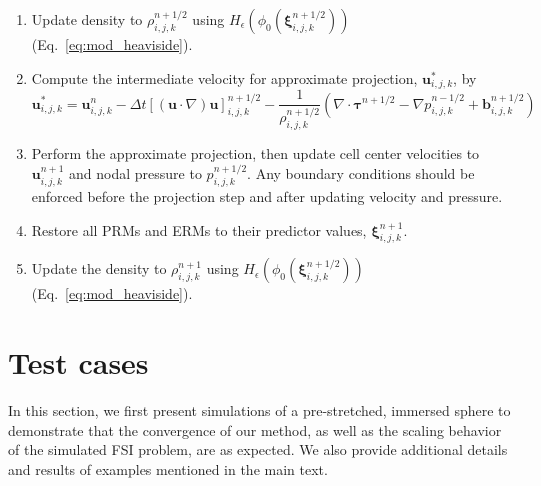 \documentclass[times, 10pt]{article}
\renewcommand{\vec}[1]{\mathbf{#1}}
\newcommand{\vu}{\vec{u}}
\newcommand{\vxi}{\boldsymbol\xi}
\newcommand{\vtau}{\boldsymbol\tau}
\begin{document}
\begin{enumerate}
	\item Update density to $\rho_{i,j,k}^{n+1/2}$ using $H_\epsilon(\phi_0(  \vxi_{i,j,k}^{n+1/2} ))$ (Eq.~\eqref{eq:mod_heaviside}).

	\item Compute the intermediate velocity for approximate projection, $\vu_{i,j,k}^{*}$, by
	\begin{equation} \vu_{i,j,k}^{*} = \vu_{i,j,k}^n - \Delta t [(\vu \cdot \nabla) \vu ]_{i,j,k}^{n+1/2} - \frac{1}{\rho_{i,j,k}^{n+1/2}} \left( \nabla \cdot  \vtau^{n+1/2} - \nabla p_{i,j,k}^{n-1/2} + \mathbf b_{i,j,k}^{n+1/2}\right)
	\end{equation}

	\item Perform the approximate projection, then update cell center velocities to $\vu_{i,j,k}^{n+1}$ and nodal pressure to $p_{i,j,k}^{n+1/2}$. Any boundary conditions should be enforced before the projection step and after updating velocity and pressure.

	\item Restore all PRMs and ERMs to their predictor values, $\vxi_{i,j,k}^{n+1}$.

	\item Update the density to $\rho_{i,j,k}^{n+1}$ using $H_\epsilon(\phi_0(  \vxi_{i,j,k}^{n+1/2} ))$ (Eq.~\eqref{eq:mod_heaviside}).
\end{enumerate}

\section{Test cases}
    In this section, we first present simulations of a pre-stretched, immersed sphere to demonstrate that
    the convergence of our method, as well as the scaling behavior of the simulated FSI problem, are as expected.
    We also provide additional details and results of examples mentioned in the main text.

\end{document}
